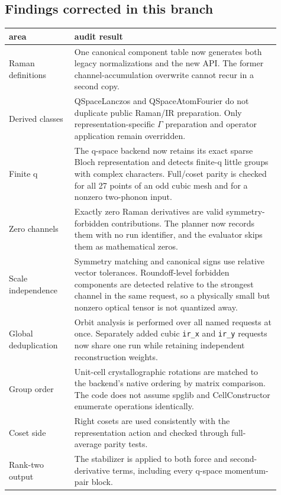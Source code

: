 \documentclass[11pt,a4paper]{article}
\begin{document}
\subsection{Findings corrected in this branch}

\begin{longtable}{@{}p{0.22\linewidth}p{0.69\linewidth}@{}}
\toprule
area & audit result\\
\midrule
\endhead
Raman definitions & One canonical component table now generates both legacy
normalizations and the new API.  The former channel-accumulation overwrite
cannot recur in a second copy.\\[3pt]
Derived classes & QSpaceLanczos and QSpaceAtomFourier do not duplicate public
Raman/IR preparation.  Only representation-specific $\Gamma$ preparation and
operator application remain overridden.\\[3pt]
Finite q & The q-space backend now retains its exact sparse Bloch
representation and detects finite-q little groups with complex characters.
Full/coset parity is checked for all 27 points of an odd cubic mesh and for a
nonzero two-phonon input.\\[3pt]
Zero channels & Exactly zero Raman derivatives are valid symmetry-forbidden
contributions.  The planner now records them with no run identifier, and the
evaluator skips them as mathematical zeros.\\[3pt]
Scale independence & Symmetry matching and canonical signs use relative
vector tolerances.  Roundoff-level forbidden components are detected relative
to the strongest channel in the same request, so a physically small but
nonzero optical tensor is not quantized away.\\[3pt]
Global deduplication & Orbit analysis is performed over all named requests at
once.  Separately added cubic \texttt{ir\_x} and \texttt{ir\_y} requests now
share one run while retaining independent reconstruction weights.\\[3pt]
Group order & Unit-cell crystallographic rotations are matched to the
backend's native ordering by matrix comparison.  The code does not assume
spglib and CellConstructor enumerate operations identically.\\[3pt]
Coset side & Right cosets are used consistently with the representation action
and checked through full-average parity tests.\\[3pt]
Rank-two output & The stabilizer is applied to both force and second-derivative
terms, including every q-space momentum-pair block.\\[3pt]

\end{longtable}
\end{document}
